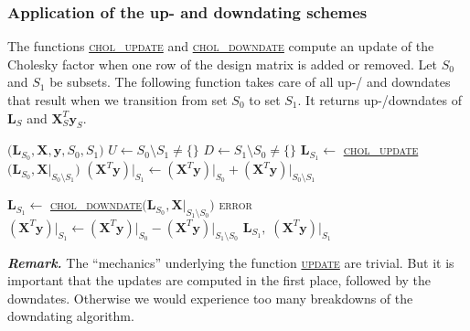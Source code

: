 \documentclass[a4paper,oneside,11pt,DIV=12]{scrartcl}
\begin{document}
\subsubsection{Application of the up- and downdating schemes}
The functions \hyperlink{alg:cholupdate}{\textsc{chol\_update}} and \hyperlink{alg:choldowndate}{\textsc{chol\_downdate}} compute an update of the Cholesky factor when one row of the design matrix is added or removed. Let $S_0$ and $S_1$ be subsets. The following function takes care of all up-/ and downdates that result when we transition from set $S_0$ to set $S_1$. It returns up-/downdates of $\bm L_S$ and $\bm X^T_S\bm y_S$. 

\begin{algorithmic}[1]
	\hypertarget{alg:update}{}$\big(\bm L_{S_0}, \bm X, \bm y, S_0, S_1\big)$
		\State $U \gets S_0 \setminus S_1 \neq \{\}$
		\State $D \gets S_1 \setminus S_0 \neq \{\}$
			\State $\bm L_{S_1} \gets$ \hyperlink{alg:cholupdate}{\textsc{chol\_update}}$\big( \bm L_{S_0}, \bm X \vert_{S_0 \setminus S_1}\big)$
			\State $(\bm X^T  \bm y)\vert_{S_1} \gets (\bm X^T \bm y)\vert_{S_0} + (\bm X^T \bm y)\vert_{S_0 \setminus S_1}$
		\EndFor

			\State $\bm L_{S_1} \gets$ \hyperlink{alg:choldowndate}{\textsc{chol\_downdate}}$\big( \bm L_{S_0}, \bm X \vert_{S_1 \setminus S_0}\big)$
				\State \Return \textsc{error}
			\EndIf
			\State $(\bm X^T  \bm y)\vert_{S_1} \gets (\bm X^T \bm y)\vert_{S_0} - (\bm X^T \bm y)\vert_{S_1 \setminus S_0}$
		\EndFor
		\State \Return $\bm L_{S_1}, \;(\bm X^T  \bm y)\vert_{S_1}$
	\EndFunction
\end{algorithmic}

\vspace{1em}
\noindent\textbf{\sffamily \small \itshape Remark.} The ``mechanics'' underlying the function \hyperlink{alg:update}{\textsc{update}} are trivial. But it is important that the updates are computed in the first place, followed by the downdates. Otherwise we would experience too many breakdowns of the downdating algorithm.    

\end{document}
